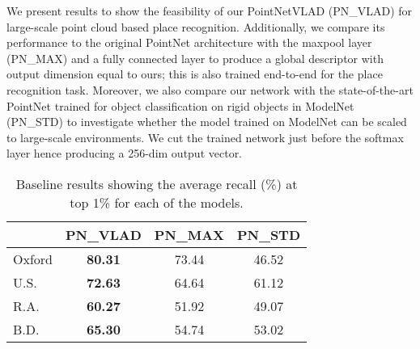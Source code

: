 \documentclass[10pt,twocolumn,letterpaper]{article}
\begin{document}
We present results to show the feasibility of our PointNetVLAD (PN\_VLAD) for large-scale point cloud based place recognition. Additionally, we compare its performance to the original PointNet architecture with the maxpool layer (PN\_MAX) and a fully connected layer to produce a global descriptor with output dimension equal to ours; this is also trained end-to-end for the place recognition task. Moreover, we also compare our network with the state-of-the-art PointNet trained for object classification on rigid objects in ModelNet (PN\_STD) to investigate whether the model trained on ModelNet can be scaled to large-scale environments. We cut the trained network just before the softmax layer hence producing a 256-dim output vector. 
\newline
\begin{table}
	\begin{center}
		\begin{tabular}{|l|c|c|c|}
			\hline
			& PN\_VLAD & PN\_MAX & PN\_STD\\
			\hline
			Oxford& \textbf{80.31} & 73.44 & 46.52  \\
			\hline
			U.S.& \textbf{72.63} & 64.64 & 61.12 \\
			\hline
			R.A.& \textbf{60.27} & 51.92 & 49.07 \\
			\hline
			B.D.& \textbf{65.30} & 54.74 & 53.02\\
			\hline			
		\end{tabular}
	\end{center}
	\vspace{-0.2cm}
	\caption{Baseline results showing the average recall (\%) at top 1\% for each of the models.\vspace{-0.2cm}}
	\label{tab:baseline}
\end{table}
\end{document}
